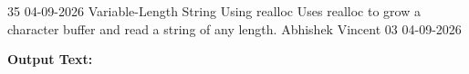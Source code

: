 \clearpage
\label{prog:35}
\programhead
  {35}
  {04-09-2026}
  {Variable-Length String Using realloc}
  {Uses realloc to grow a character buffer and read a string of any length.}
  {Abhishek Vincent}
  {03}
  {04-09-2026}

\divider
\textbf{Output Text:}\par
\vspace{2pt}

